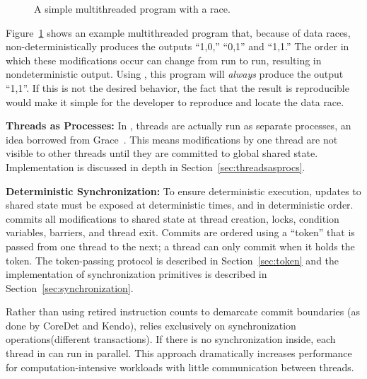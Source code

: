 \label{sec:dthreads-architecture}

\begin{figure}[!ht]
\fbox{
\subfigure{}
\hspace{10pt}
\subfigure{}
\hspace{10pt}
\subfigure{}
}
\caption{A simple multithreaded program with a race.\label{fig:sample}}
\end{figure}

Figure~\ref{fig:sample} shows an example multithreaded program that,
because of data races, non-deterministically produces the outputs
``1,0,'' ``0,1'' and ``1,1.''  The order in which these modifications
occur can change from run to run, resulting in nondeterministic
output.  Using \dthreads{}, this program will \emph{always} produce
the output ``1,1''. If this is not the desired behavior, the fact that
the result is reproducible would make it simple for the developer to
reproduce and locate the data race.

\textbf{Threads as Processes:}
In \dthreads{}, threads are actually run as separate processes, an idea borrowed from Grace~\cite{grace}.  This means modifications by one thread are not visible to other threads until they are committed to global shared state.  Implementation is discussed in depth in Section~\ref{sec:threadsasprocs}.


\textbf{Deterministic Synchronization:}
To ensure deterministic execution, updates to shared state must be exposed at deterministic times, and in deterministic order.  \dthreads{} commits all modifications to shared state at thread creation, locks, condition variables, barriers, and thread exit.  Commits are ordered using a ``token'' that is passed from one thread to the next; a thread can only commit when it holds the token.  The token-passing protocol is described in Section~\ref{sec:token} and the implementation of synchronization primitives is described in Section~\ref{sec:synchronization}.

Rather than using retired instruction counts to demarcate commit
boundaries (as done by CoreDet and Kendo), \dthreads{} relies
exclusively on synchronization operations(different transactions). 
If there is no synchronization inside, each thread in \dthreads{} can run in
parallel. This approach dramatically increases performance for
computation-intensive workloads with little communication between
threads.

